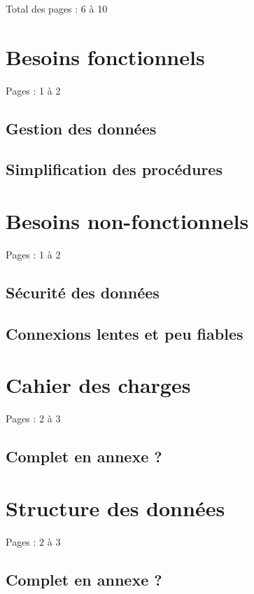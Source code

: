 \documentclass{eplmastersthesis_FR}
\begin{document}
		Total des pages : 6 à 10

		\section{Besoins fonctionnels}

			Pages : 1 à 2

			\subsection*{Gestion des données}
			\subsection*{Simplification des procédures}

		\section{Besoins non-fonctionnels}

			Pages : 1 à 2

			\subsection*{Sécurité des données}
			\subsection*{Connexions lentes et peu fiables}

		\section{Cahier des charges}

			Pages : 2 à 3

			\subsection*{Complet en annexe ?}

		\section{Structure des données}

			Pages : 2 à 3

			\subsection*{Complet en annexe ?}
\end{document}
